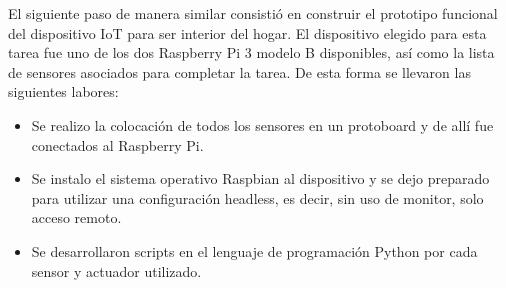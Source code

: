 El siguiente paso de manera similar consistió en construir el prototipo funcional del dispositivo IoT para ser interior del hogar. El dispositivo elegido para esta tarea fue uno de los dos Raspberry Pi 3 modelo B disponibles, así como la lista de sensores asociados para completar la tarea. De esta forma se llevaron las siguientes labores:
\begin{itemize}
\item Se realizo la colocación de todos los sensores en un protoboard y de allí fue conectados al Raspberry Pi.

\item Se instalo el sistema operativo Raspbian al dispositivo y se dejo preparado para utilizar una configuración headless, es decir, sin uso de monitor, solo acceso remoto.

\item Se desarrollaron scripts en el lenguaje de programación Python por cada sensor y actuador utilizado. 


\end{itemize}
